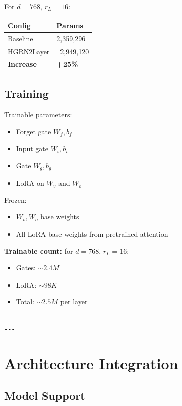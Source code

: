 For $d = 768$, $r_L = 16$:

\begin{table}[H]
\centering
\small
\begin{tabular}{ll}
\toprule
\textbf{Config} & \textbf{Params} \\
\midrule
Baseline & 2,359,296 \\
HGRN2Layer & ~2,949,120 \\
\textbf{Increase} & \textbf{+25\%} \\
\bottomrule
\end{tabular}
\end{table}

\subsection{Training}

Trainable parameters:
\begin{itemize}
\item Forget gate $W_f, b_f$
\item Input gate $W_i, b_i$
\item Gate $W_g, b_g$
\item LoRA on $W_v$ and $W_o$

\end{itemize}
Frozen:
\begin{itemize}
\item $W_v, W_o$ base weights
\item All LoRA base weights from pretrained attention

\end{itemize}
\textbf{Trainable count:} for $d = 768$, $r_L = 16$:
\begin{itemize}
\item Gates: $\sim 2.4M$
\item LoRA: $\sim 98K$
\item Total: $\sim 2.5M$ per layer
\end{itemize}
\begin{lstlisting}

---
\end{lstlisting}

\section{Architecture Integration}

\subsection{Model Support}

